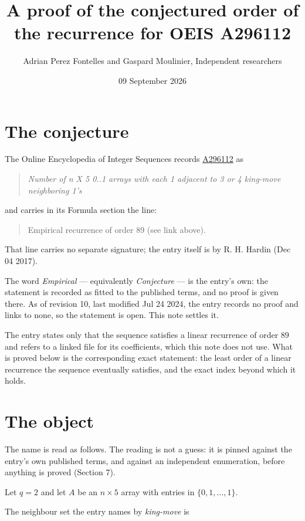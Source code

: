 \documentclass[11pt]{article}
\title{A proof of the conjectured order of the recurrence for OEIS A296112}
\author{Adrian Perez Fontelles and Gaspard Moulinier, Independent researchers}
\date{09 September 2026}
\theoremstyle{definition}
\begin{document}
\maketitle
\section{The conjecture}

The Online Encyclopedia of Integer Sequences records \href{https://oeis.org/A296112}{A296112} as

\begin{quote}\itshape Number of n X 5 0..1 arrays with each 1 adjacent to 3 or 4 king-move neighboring 1's\end{quote}

and carries in its Formula section the line:

\begin{quote}\ttfamily Empirical recurrence of order 89 (see link above).\end{quote}

That line carries no separate signature; the entry itself is by R. H. Hardin (Dec 04 2017).

The word {\itshape Empirical} --- equivalently {\itshape Conjecture} --- is the entry's own: the statement is recorded as fitted to the published terms, and no proof is given there. As of revision 10, last modified Jul 24 2024, the entry records no proof and links to none, so the statement is open. This note settles it.

The entry states only that the sequence satisfies a linear recurrence of order $89$ and refers to a linked file for its coefficients, which this note does not use. What is proved below is the corresponding exact statement: the least order of a linear recurrence the sequence eventually satisfies, and the exact index beyond which it holds.

\section{The object}

The name is read as follows. The reading is not a guess: it is pinned against the entry's own published terms, and against an independent enumeration, before anything is proved (Section 7).

Let $q = 2$ and let $A$ be an $n \times 5$ array with entries in $\{0,1,\dots,1\}$.

The neighbour set the entry names by {\itshape king-move} is
\end{document}
